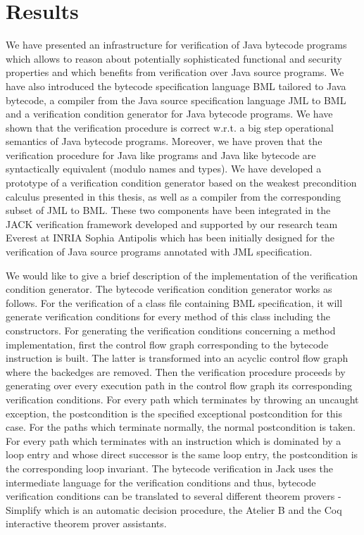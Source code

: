 
\section{Results}
We have  presented an infrastructure for verification of Java bytecode programs   which allows to reason about potentially
sophisticated  functional and security properties and
which benefits from verification over Java source programs. We have also 
introduced the bytecode specification language BML tailored to Java bytecode, a compiler
from the Java source specification language JML to BML and a verification 
condition generator for Java bytecode programs. 
We have shown that the verification procedure is correct w.r.t. a big step  operational semantics of Java bytecode programs. 
Moreover, we have
proven that the verification procedure for Java like programs
and Java like bytecode are syntactically equivalent (modulo names and types). 
We have developed a prototype of a verification condition generator based on the weakest precondition calculus presented in this thesis, as well 
as a compiler from the corresponding subset of JML to BML.
These two components have been integrated in the JACK \cite{BRL-JACK} verification framework 
developed and supported by our research team Everest at INRIA Sophia Antipolis which has been initially designed for
 the verification of Java source programs annotated with JML specification.

We would like to give a brief description of the implementation of the verification condition generator.
The bytecode verification condition generator works as follows. For the verification of a class file containing BML specification, it will generate verification conditions for every
 method of this class including the constructors. For generating the verification conditions concerning a method implementation, first the control flow
 graph corresponding to the bytecode instruction is built. The latter is transformed into an acyclic control flow graph where the backedges are 
removed.
 Then the verification procedure proceeds by generating over every execution path in the control flow graph its corresponding verification conditions. 
For every path which terminates by throwing an uncaught exception, the postcondition is the specified exceptional postcondition for this case. For the paths which terminate normally, 
the normal postcondition is taken. For every path which terminates with an instruction which is dominated by a loop entry and whose direct successor is the same loop entry, the postcondition 
is the corresponding loop invariant. The bytecode verification in Jack uses the intermediate language for the verification conditions and thus, bytecode verification conditions 
 can be translated to several different theorem provers - Simplify \cite{Simpl05DNS} which is an automatic decision procedure, 
the Atelier B and the Coq interactive theorem prover assistants. 

